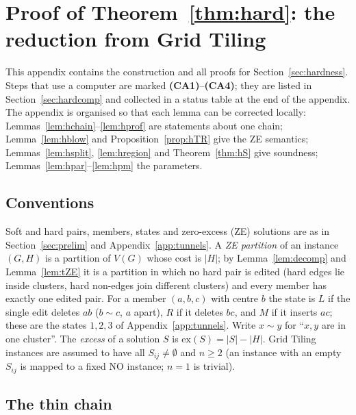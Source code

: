 \section{Proof of Theorem~\ref{thm:hard}: the reduction from Grid Tiling}\label{app:hardness}
This appendix contains the construction and all proofs for Section~\ref{sec:hardness}. Steps that use a computer are marked \textbf{(CA1)}--\textbf{(CA4)}; they are listed in Section~\ref{sec:hardcomp} and collected in a status table at the end of the appendix. The appendix is organised so that each lemma can be corrected locally: Lemmas~\ref{lem:hchain}--\ref{lem:hprof} are statements about one chain; Lemma~\ref{lem:hblow} and Proposition~\ref{prop:hTR} give the ZE semantics; Lemmas~\ref{lem:hsplit}, \ref{lem:hregion} and Theorem~\ref{thm:hS} give soundness; Lemmas~\ref{lem:hpar}--\ref{lem:hpm} the parameters.

\subsection{Conventions}\label{sec:hconv}
Soft and hard pairs, members, states and zero-excess (ZE) solutions are as in Section~\ref{sec:prelim} and Appendix~\ref{app:tunnels}. A \emph{ZE partition} of an instance $(G,H)$ is a partition of $V(G)$ whose cost is $|H|$; by Lemma~\ref{lem:decomp} and Lemma~\ref{lem:tZE} it is a partition in which no hard pair is edited (hard edges lie inside clusters, hard non-edges join different clusters) and every member has exactly one edited pair. For a member $(a,b,c)$ with centre $b$ the state is $L$ if the single edit deletes $ab$ ($b\sim c$, $a$ apart), $R$ if it deletes $bc$, and $M$ if it inserts $ac$; these are the states $1,2,3$ of Appendix~\ref{app:tunnels}. Write $x\sim y$ for ``$x,y$ are in one cluster''. The \emph{excess} of a solution $S$ is $\mathrm{ex}(S)=|S|-|H|$. Grid Tiling instances are assumed to have all $S_{ij}\ne\emptyset$ and $n\ge2$ (an instance with an empty $S_{ij}$ is mapped to a fixed NO instance; $n=1$ is trivial).

\subsection{The thin chain}\label{sec:hthin}

